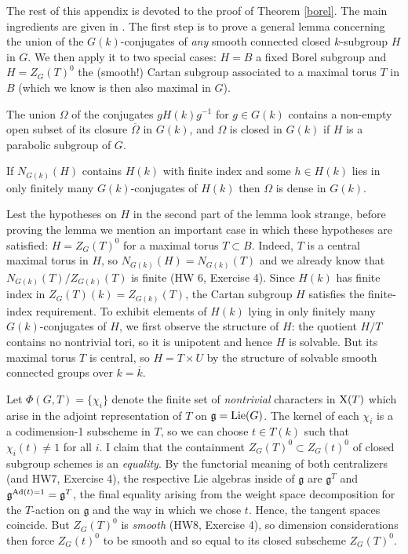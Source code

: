 \documentclass[10pt]{article}
\renewcommand{\(}{\left(}
\renewcommand{\)}{\right)}
\numberwithin{thm}{subsection}
\begin{document}
The rest of this appendix is devoted to the proof of Theorem \ref{borel}.
The main ingredients are given in \cite[11.9, 11.10]{borel}. 
The first step is to prove a general lemma concerning the union of
the $G(k)$-conjugates of {\em any} smooth  connected closed $k$-subgroup $H$ in $G$.
We then apply it to two special cases: $H = B$ a fixed Borel subgroup
and $H = Z_G(T)^0$ the (smooth!) Cartan subgroup associated to a maximal torus $T$ in $B$
(which we know is then also maximal in $G$). 

\begin{lemma}\label{lemmaprop}
The union $\Omega$ of the conjugates $gH(k)g^{-1}$ for $g \in G(k)$
contains a non-empty open subset of its closure $\overline{\Omega}$ in $G(k)$,
and $\Omega$ is closed in $G(k)$ if $H$ is a parabolic subgroup of $G$.

If $N_{G(k)}(H)$ contains $H(k)$ with finite index
and some $h \in H(k)$ lies in only finitely many $G(k)$-conjugates of $H(k)$
then $\Omega$ is dense in $G(k)$.
\end{lemma}

Lest the hypotheses on $H$ in the second part of the lemma look strange, 
before proving the lemma we mention an important case in which these hypotheses are satisfied:
$H = Z_G(T)^0$ for a maximal torus $T \subset B$.  Indeed, 
$T$ is a central maximal torus in $H$, so $N_{G(k)}(H) = N_{G(k)}(T)$
and we already know that $N_{G(k)}(T)/Z_{G(k)}(T)$ is finite (HW 6, Exercise 4).
Since $H(k)$ has finite index in $Z_G(T)(k) = Z_{G(k)}(T)$, 
the Cartan subgroup $H$ satisfies the finite-index requirement. 
To exhibit elements of $H(k)$ lying in only finitely many $G(k)$-conjugates of $H$, 
we first observe the structure of $H$:  the quotient $H/T$ contains no nontrivial tori, so
it is unipotent and hence $H$ is solvable.  But its maximal torus $T$ is central, so
$H = T \times U$ by the structure of solvable smooth connected groups over $k = \overline{k}$.  

Let $\Phi(G,T) = \{\chi_i\}$ denote the finite set of {\em nontrivial} characters in
${\rm{X}}(T)$ which arise in the adjoint representation of $T$ on
$\mathfrak{g} = {\rm{Lie}}(G)$.  The kernel of each $\chi_i$ is a 
a codimension-1 subscheme in $T$, so we can choose 
$t \in T(k)$ such that $\chi_i(t) \ne 1$
for all $i$. I claim that the containment $Z_G(T)^0 \subset Z_G(t)^0$ 
of closed subgroup schemes is an {\em equality}.  By the functorial
meaning of both centralizers (and HW7, Exercise 4), the respective Lie algebras inside of 
$\mathfrak{g}$ are $\mathfrak{g}^T$ and
$\mathfrak{g}^{{\rm{Ad}}(t)=1} = \mathfrak{g}^T$,
the final equality arising from the weight space decomposition for
the $T$-action on $\mathfrak{g}$ and the way in which we chose $t$.  
Hence, the tangent spaces coincide.  But $Z_G(T)^0$ is {\em smooth} (HW8, Exercise 4), so
dimension considerations then force $Z_G(t)^0$ to be smooth
and so equal to its closed subscheme $Z_G(T)^0$.  
\end{document}
